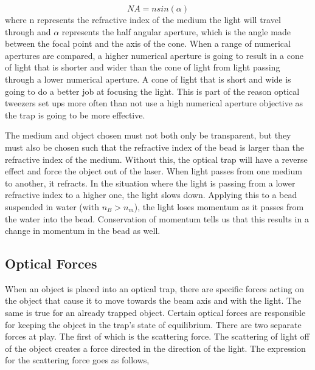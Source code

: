 \documentclass[%
 aip,
 amsmath,amssymb,
 reprint,%
]{revtex4-1}
\begin{document}
    \begin{equation}
        NA = nsin(\alpha)
    \end{equation}
    where n represents the refractive index of the medium the light will travel through and $\alpha$ represents the half angular aperture, which is the angle made between the focal point and the axis of the cone\cite{NA}. When a range of numerical apertures are compared, a higher numerical aperture is going to result in a cone of light that is shorter and wider than the cone of light from light passing through a lower numerical aperture. A cone of light that is short and wide is going to do a better job at focusing the light. This is part of the reason optical tweezers set ups more often than not use a high numerical aperture objective as the trap is going to be more effective.
        
    The medium and object chosen must not both only be transparent, but they must also be chosen such that the refractive index of the bead is larger than the refractive index of the medium. Without this, the optical trap will have a reverse effect and force the object out of the laser\cite{ashkin}. When light passes from one medium to another, it refracts. In the situation where the light is passing from a lower refractive index to a higher one, the light slows down. Applying this to a bead suspended in water (with $n_B > n_m$), the light loses momentum as it passes from the water into the bead. Conservation of momentum tells us that this results in a change in momentum in the bead as well. 

    \subsection{\label{sec:level2}Optical Forces}
    
    When an object is placed into an optical trap, there are specific forces acting on the object that cause it to move towards the beam axis and with the light. The same is true for an already trapped object. Certain optical forces are responsible for keeping the object in the trap's state of equilibrium. There are two separate forces at play. The first of which is the scattering force. The scattering of light off of the object creates a force directed in the direction of the light. The expression for the scattering force\cite{brownian} goes as follows,
    
\end{document}

